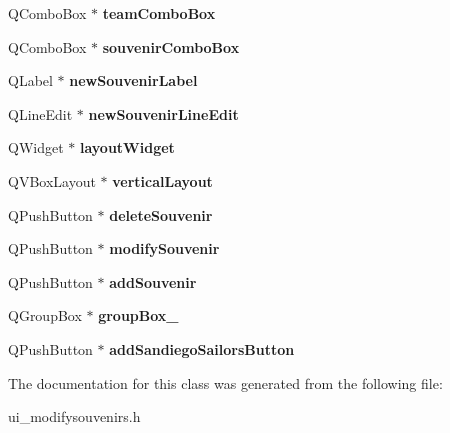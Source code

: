 \begin{DoxyCompactItemize}
Q\+Combo\+Box $\ast$ {\bfseries team\+Combo\+Box}
\item 
\mbox{\label{class_ui__modifysouvenirs_a36b6689d83cb203e609338792601610e}} 
Q\+Combo\+Box $\ast$ {\bfseries souvenir\+Combo\+Box}
\item 
\mbox{\label{class_ui__modifysouvenirs_a789bf12dd9c15b8bf55d0ceb7b91e1f6}} 
Q\+Label $\ast$ {\bfseries new\+Souvenir\+Label}
\item 
\mbox{\label{class_ui__modifysouvenirs_ac4d46d08e68d2bec4204a6b7204e919a}} 
Q\+Line\+Edit $\ast$ {\bfseries new\+Souvenir\+Line\+Edit}
\item 
\mbox{\label{class_ui__modifysouvenirs_a0200ccee44d6b2cd8595cc580ce4e58e}} 
Q\+Widget $\ast$ {\bfseries layout\+Widget}
\item 
\mbox{\label{class_ui__modifysouvenirs_ad49cd42a8450e02d7cd2ba487bf96a62}} 
Q\+V\+Box\+Layout $\ast$ {\bfseries vertical\+Layout}
\item 
\mbox{\label{class_ui__modifysouvenirs_a0ae86af68371d8cd99a2aeba4756ede1}} 
Q\+Push\+Button $\ast$ {\bfseries delete\+Souvenir}
\item 
\mbox{\label{class_ui__modifysouvenirs_aa1cbe1aab0166fc6a75ded347ddca9b8}} 
Q\+Push\+Button $\ast$ {\bfseries modify\+Souvenir}
\item 
\mbox{\label{class_ui__modifysouvenirs_a0bba50e69a604a5c5d6fee2daa76f43b}} 
Q\+Push\+Button $\ast$ {\bfseries add\+Souvenir}
\item 
\mbox{\label{class_ui__modifysouvenirs_af3f05c3c14ddc0489b83439d13b3a681}} 
Q\+Group\+Box $\ast$ {\bfseries group\+Box\+\_}
\item 
\mbox{\label{class_ui__modifysouvenirs_ace4aba2b9ee276c4734f0f03ace8e565}} 
Q\+Push\+Button $\ast$ {\bfseries add\+Sandiego\+Sailors\+Button}
\end{DoxyCompactItemize}


The documentation for this class was generated from the following file\+:\begin{DoxyCompactItemize}
\item 
ui\+\_\+modifysouvenirs.\+h\end{DoxyCompactItemize}
